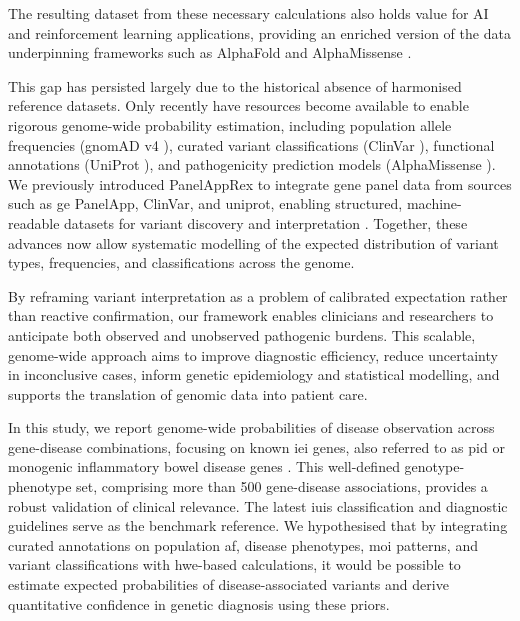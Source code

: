 The resulting dataset from these necessary calculations also holds value for AI and reinforcement learning applications, providing an enriched version of the data underpinning frameworks such as AlphaFold \cite{jumper_highly_2021} and AlphaMissense \cite{cheng_accurate_2023}.

This gap has persisted largely due to the historical absence of harmonised reference datasets. Only recently have resources become available to enable rigorous genome-wide probability estimation, including population allele frequencies (gnomAD v4 \cite{karczewski2020mutational}), curated variant classifications (ClinVar \cite{landrum_clinvar_2018}), functional annotations (UniProt \cite{the_uniprot_consortium_uniprot_2025}), and pathogenicity prediction models (AlphaMissense \cite{cheng_accurate_2023}). We previously introduced PanelAppRex to integrate gene panel data from sources such as \ac{ge} PanelApp, ClinVar, and \ac{uniprot}, enabling structured, machine-readable datasets for variant discovery and interpretation \cite{lawless_panelapprex_2025, martin_panelapp_2019, landrum_clinvar_2018, the_uniprot_consortium_uniprot_2025}. Together, these advances now allow systematic modelling of the expected distribution of variant types, frequencies, and classifications across the genome.

By reframing variant interpretation as a problem of calibrated expectation rather than reactive confirmation, our framework enables clinicians and researchers to anticipate both observed and unobserved pathogenic burdens. This scalable, genome-wide approach aims to improve diagnostic efficiency, reduce uncertainty in inconclusive cases, inform genetic epidemiology and statistical modelling, and supports the translation of genomic data into patient care.

In this study, we report genome-wide probabilities of disease observation across gene-disease combinations, focusing on known \ac{iei} genes, also referred to as \ac{pid} or monogenic inflammatory bowel disease genes \cite{poli_human_2025, lawless_panelapprex_2025, martin_panelapp_2019}. This well-defined genotype-phenotype set, comprising more than 500 gene-disease associations, provides a robust validation of clinical relevance. The latest \ac{iuis} classification and diagnostic guidelines \cite{poli_human_2025, bousfiha_2024_2025} serve as the benchmark reference. We hypothesised that by integrating curated annotations on population \ac{af}, disease phenotypes, \ac{moi} patterns, and variant classifications with \ac{hwe}-based calculations, it would be possible to estimate expected probabilities of disease-associated variants and derive quantitative confidence in genetic diagnosis using these priors.

